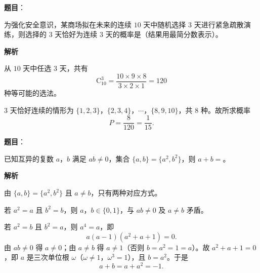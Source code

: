 \begin{answer}

\textbf{题目}：

为强化安全意识，某商场拟在未来的连续 $10$ 天中随机选择 $3$ 天进行紧急疏散演练，则选择的 $3$ 天恰好为连续 $3$ 天的概率是\gkblank{}（结果用最简分数表示）。

\textbf{解析}

从 $10$ 天中任选 $3$ 天，共有
\nopagebreak[4]
\[\mathrm C_{10}^3=\frac{10\times9\times8}{3\times2\times1}=120\]
种等可能的选法。

$3$ 天恰好连续的情形为 $\{1,2,3\}$，$\{2,3,4\}$，$\cdots$，$\{8,9,10\}$，共 $8$ 种。故所求概率
\nopagebreak[4]
\[P=\frac8{120}=\frac1{15}.\]


\end{answer}
\begin{answer}

\textbf{题目}：

已知互异的复数 $a$，$b$ 满足 $ab\neq0$，集合 $\{a,b\}=\{a^2,b^2\}$，则 $a+b=$\gkblank{}。

\textbf{解析}

由 $\{a,b\}=\{a^2,b^2\}$ 且 $a\neq b$，只有两种对应方式。

若 $a^2=a$ 且 $b^2=b$，则 $a$，$b\in\{0,1\}$，与 $ab\neq0$ 及 $a\neq b$ 矛盾。

若 $a^2=b$ 且 $b^2=a$，则 $a^4=a$，即
\nopagebreak[4]
\[a(a-1)(a^2+a+1)=0 .\]
由 $ab\neq0$ 得 $a\neq0$；由 $a\neq b$ 得 $a\neq1$（否则 $b=a^2=1=a$）。故 $a^2+a+1=0$，即 $a$ 是三次单位根 $\omega$（$\omega\neq1$，$\omega^3=1$），且 $b=a^2$。于是
\nopagebreak[4]
\[a+b=a+a^2=-1 .\]


\end{answer}
